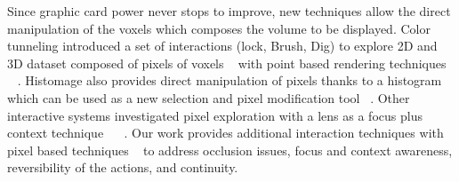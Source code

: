 Since graphic card power never stops to improve, new techniques allow the direct manipulation of the voxels which composes the volume to be displayed. Color tunneling introduced a set of interactions (lock, Brush, Dig) to explore 2D and 3D dataset composed of pixels of voxels ~\cite{hurter_interactive_2014} with point based rendering techniques ~\cite{sainz_point-based_2004} . Histomage also provides direct manipulation of pixels thanks to a histogram which can be used as a new selection and pixel modification tool ~\cite{chevalier_histomages:_2012}. Other interactive systems investigated pixel exploration with a lens as a focus plus context technique ~\cite{elmqvist_color_2011} ~\cite{hurter_moleview:_2011}. Our work provides additional interaction techniques with pixel based techniques ~\cite{hurter_interactive_2014} to address occlusion issues, focus and context awareness, reversibility of the actions, and continuity.  